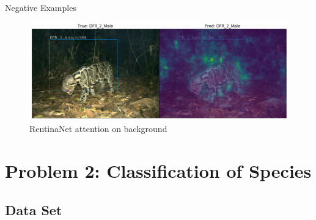 \documentclass[10pt]{beamer}
\begin{document}

\begin{frame}{Negative Examples}
	\centering
	\begin{figure}
		\includegraphics[width=\columnwidth]{images/RetinaNet_No_Attention_correct2.png}
		\caption{RentinaNet attention on background}
	\end{figure}
\end{frame}

\section{Problem 2: Classification of Species}
\subsection{Data Set}
\end{document}
